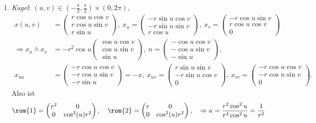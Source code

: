 \begin{example}
\begin{enumerate}
    \item \emph{Kugel}: \( (u,v) \in \left( -\tfrac{\pi}{2}, \tfrac{\pi}{2} \right) \times (0, 2\pi) \),
    \begin{align*}
      x(u,v) &= \left( \begin{smallmatrix}
      r\cos u \cos v \\ r\cos u \sin v \\ r\sin u
    \end{smallmatrix} \right), \ x_u = \left( \begin{smallmatrix}
      -r\sin u \cos v \\ -r\sin u \sin v \\ r\cos u
    \end{smallmatrix} \right), \ x_v = \left( \begin{smallmatrix}
      -r\cos u \sin v \\ r\cos u \cos v \\ 0
    \end{smallmatrix} \right) \\
    \Rightarrow x_u \wedge x_v &= -r^2\cos u \left( \begin{smallmatrix}
      \cos u \cos v \\ \cos u \sin v \\ \sin u
    \end{smallmatrix} \right), \ n = \left( \begin{smallmatrix}
      -\cos u \cos v \\ -\cos u \sin v \\ -\sin u
    \end{smallmatrix} \right), \\
    x_{uu} &= \left( \begin{smallmatrix}
      -r\cos u\cos v \\ -r\cos u \sin v \\ -r\sin u
    \end{smallmatrix} \right) = -x, \ x_{uv} = \left( \begin{smallmatrix}
      r\sin u \sin v \\ -r\sin u \cos v \\ 0
    \end{smallmatrix} \right), \ x_{vv} = \left( \begin{smallmatrix}
      -r\cos u \cos v \\ -r\cos u \sin v \\ 0
    \end{smallmatrix} \right)\text{.}
    \end{align*}
    Also ist
    \begin{equation*}
      \rom{1} = \begin{pmatrix}
        r^2 & 0 \\
        0 & \cos^2(u)r^2
      \end{pmatrix}, \quad \rom{2} = \begin{pmatrix}
        r & 0 \\
        0 & \cos^2(u)r^2
      \end{pmatrix}, \quad \Rightarrow \kappa = \frac{r^2\cos^2 u}{r^4\cos^2 u} = \frac{1}{r^2}
    \end{equation*}


\end{enumerate}
\end{example}
